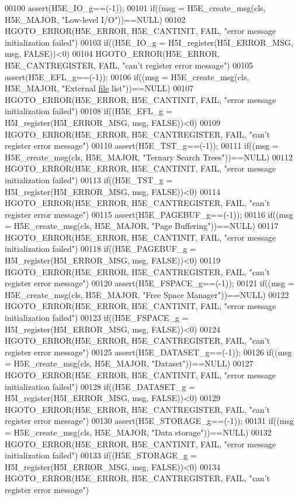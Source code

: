 \begin{DoxyCode}
00100 assert(H5E\_IO\_g==(-1));
00101 if((msg = H5E\_create\_msg(cls, H5E\_MAJOR, "Low-level I/O"))==NULL)
00102     HGOTO\_ERROR(H5E\_ERROR, H5E\_CANTINIT, FAIL, "error message initialization failed")
00103 if((H5E\_IO\_g = H5I\_register(H5I\_ERROR\_MSG, msg, FALSE))<0)
00104     HGOTO\_ERROR(H5E\_ERROR, H5E\_CANTREGISTER, FAIL, "can't register error message")
00105 assert(H5E\_EFL\_g==(-1));
00106 if((msg = H5E\_create\_msg(cls, H5E\_MAJOR, "External \hyperlink{structfile}{file} list"))==NULL)
00107     HGOTO\_ERROR(H5E\_ERROR, H5E\_CANTINIT, FAIL, "error message initialization failed")
00108 if((H5E\_EFL\_g = H5I\_register(H5I\_ERROR\_MSG, msg, FALSE))<0)
00109     HGOTO\_ERROR(H5E\_ERROR, H5E\_CANTREGISTER, FAIL, "can't register error message")
00110 assert(H5E\_TST\_g==(-1));
00111 if((msg = H5E\_create\_msg(cls, H5E\_MAJOR, "Ternary Search Trees"))==NULL)
00112     HGOTO\_ERROR(H5E\_ERROR, H5E\_CANTINIT, FAIL, "error message initialization failed")
00113 if((H5E\_TST\_g = H5I\_register(H5I\_ERROR\_MSG, msg, FALSE))<0)
00114     HGOTO\_ERROR(H5E\_ERROR, H5E\_CANTREGISTER, FAIL, "can't register error message")
00115 assert(H5E\_PAGEBUF\_g==(-1));
00116 if((msg = H5E\_create\_msg(cls, H5E\_MAJOR, "Page Buffering"))==NULL)
00117     HGOTO\_ERROR(H5E\_ERROR, H5E\_CANTINIT, FAIL, "error message initialization failed")
00118 if((H5E\_PAGEBUF\_g = H5I\_register(H5I\_ERROR\_MSG, msg, FALSE))<0)
00119     HGOTO\_ERROR(H5E\_ERROR, H5E\_CANTREGISTER, FAIL, "can't register error message")
00120 assert(H5E\_FSPACE\_g==(-1));
00121 if((msg = H5E\_create\_msg(cls, H5E\_MAJOR, "Free Space Manager"))==NULL)
00122     HGOTO\_ERROR(H5E\_ERROR, H5E\_CANTINIT, FAIL, "error message initialization failed")
00123 if((H5E\_FSPACE\_g = H5I\_register(H5I\_ERROR\_MSG, msg, FALSE))<0)
00124     HGOTO\_ERROR(H5E\_ERROR, H5E\_CANTREGISTER, FAIL, "can't register error message")
00125 assert(H5E\_DATASET\_g==(-1));
00126 if((msg = H5E\_create\_msg(cls, H5E\_MAJOR, "Dataset"))==NULL)
00127     HGOTO\_ERROR(H5E\_ERROR, H5E\_CANTINIT, FAIL, "error message initialization failed")
00128 if((H5E\_DATASET\_g = H5I\_register(H5I\_ERROR\_MSG, msg, FALSE))<0)
00129     HGOTO\_ERROR(H5E\_ERROR, H5E\_CANTREGISTER, FAIL, "can't register error message")
00130 assert(H5E\_STORAGE\_g==(-1));
00131 if((msg = H5E\_create\_msg(cls, H5E\_MAJOR, "Data storage"))==NULL)
00132     HGOTO\_ERROR(H5E\_ERROR, H5E\_CANTINIT, FAIL, "error message initialization failed")
00133 if((H5E\_STORAGE\_g = H5I\_register(H5I\_ERROR\_MSG, msg, FALSE))<0)
00134     HGOTO\_ERROR(H5E\_ERROR, H5E\_CANTREGISTER, FAIL, "can't register error message")

\end{DoxyCode}
